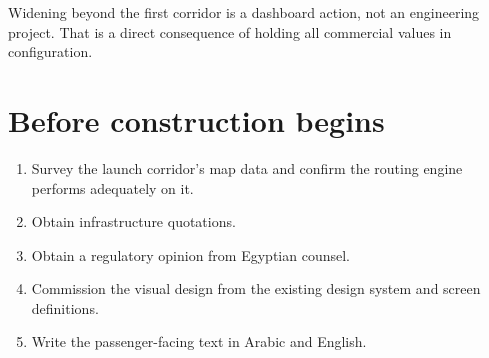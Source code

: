 \vspace{4pt}
Widening beyond the first corridor is a dashboard action, not an engineering project. That is a
direct consequence of holding all commercial values in configuration.

\section{Before construction begins}

\begin{enumerate}[label=\textbf{\arabic*.}]
\item Survey the launch corridor's map data and confirm the routing engine performs adequately on it.
\item Obtain infrastructure quotations.
\item Obtain a regulatory opinion from Egyptian counsel.
\item Commission the visual design from the existing design system and screen definitions.
\item Write the passenger-facing text in Arabic and English.
\end{enumerate}
